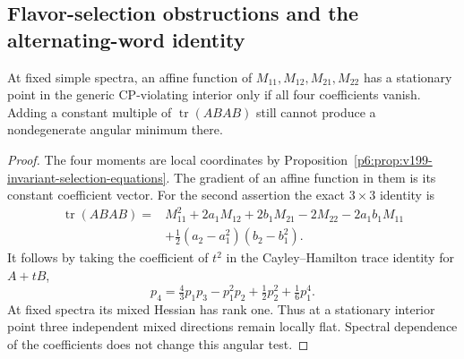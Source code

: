 \documentclass[11pt,a4paper]{article}
\begin{document}
\clearpage
\subsection{Flavor-selection obstructions and the alternating-word identity}
\label{p6:app:v199-flavor-selection}
\begin{proposition}
\label{p6:prop:v199-affine-mixed-obstruction}
At fixed simple spectra, an affine function of
\(M_{11},M_{12},M_{21},M_{22}\) has a stationary point in the generic
CP-violating interior only if all four coefficients vanish.  Adding a
constant multiple of \(\operatorname{tr}(ABAB)\) still cannot produce a
nondegenerate angular minimum there.
\end{proposition}
\begin{proof}
The four moments are local coordinates by
Proposition~\ref{p6:prop:v199-invariant-selection-equations}.  The gradient
of an affine function in them is its constant coefficient vector.  For the
second assertion the exact \(3\times3\) identity is
\begin{align}
 \operatorname{tr}(ABAB)={}&M_{11}^2+2a_1M_{12}+2b_1M_{21}-2M_{22}
 -2a_1b_1M_{11}\nonumber\\
 &+\tfrac12(a_2-a_1^2)(b_2-b_1^2).
 \label{p6:eq:v199-alternating-word}
\end{align}
It follows by taking the coefficient of \(t^2\) in the Cayley--Hamilton
trace identity for \(A+tB\),
\[
 p_4=\tfrac43p_1p_3-p_1^2p_2+\tfrac12p_2^2+\tfrac16p_1^4.
\]
At fixed spectra its mixed Hessian has rank one.  Thus at a stationary
interior point three independent mixed directions remain locally flat.
Spectral dependence of the coefficients does not change this angular test.
\end{proof}
\end{document}
